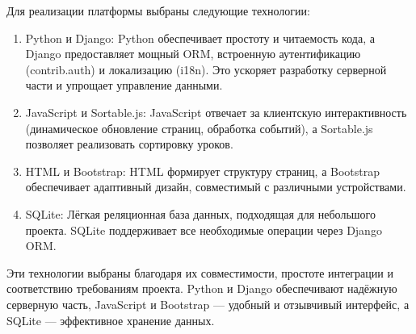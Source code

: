 Для реализации платформы выбраны следующие технологии:
\begin{enumerate}
	\item {Python и Django}: Python обеспечивает простоту и читаемость кода, а Django предоставляет мощный ORM, встроенную аутентификацию (contrib.auth) и локализацию (i18n). Это ускоряет разработку серверной части и упрощает управление данными.
	\item {JavaScript и Sortable.js}: JavaScript отвечает за клиентскую интерактивность (динамическое обновление страниц, обработка событий), а Sortable.js позволяет реализовать сортировку уроков.
	\item {HTML и Bootstrap}: HTML формирует структуру страниц, а Bootstrap обеспечивает адаптивный дизайн, совместимый с различными устройствами.
	\item {SQLite}: Лёгкая реляционная база данных, подходящая для небольшого проекта. SQLite поддерживает все необходимые операции через Django ORM.
\end{enumerate}

Эти технологии выбраны благодаря их совместимости, простоте интеграции и соответствию требованиям проекта. Python и Django обеспечивают надёжную серверную часть, JavaScript и Bootstrap — удобный и отзывчивый интерфейс, а SQLite — эффективное хранение данных.



